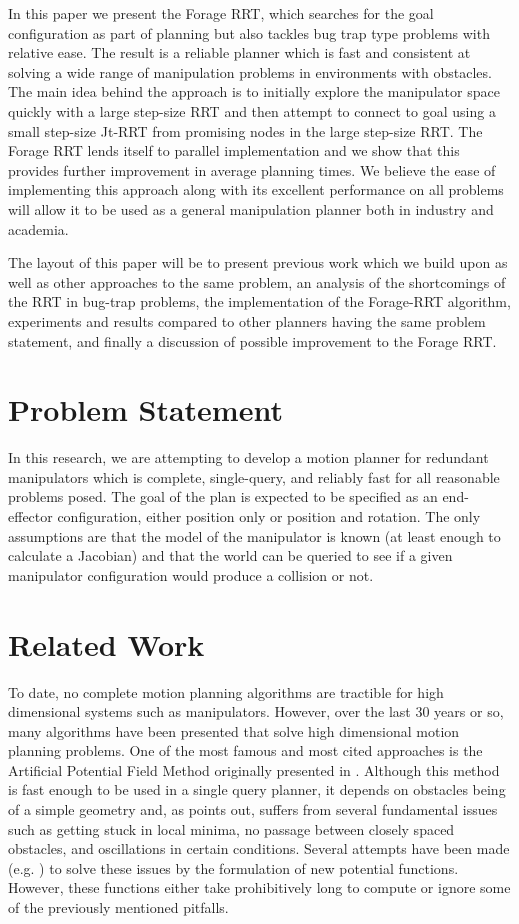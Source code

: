 \documentclass[conference]{IEEEtran}
\begin{document}
In this paper we present the Forage RRT, which searches for the goal configuration as part of planning but also tackles bug trap type
problems with relative ease. The result is a reliable planner which is fast and consistent at solving a wide range of manipulation problems
in environments with obstacles. The main idea behind the approach is to initially explore the manipulator space quickly with a large
step-size RRT and then attempt to connect to goal using a small step-size Jt-RRT from promising nodes in the large step-size RRT. The Forage
RRT lends itself to parallel implementation and we show that this provides further improvement in average planning times. We believe the
ease of implementing this approach along with its excellent performance on all problems will allow it to be used as a general manipulation
planner both in industry and academia.

The layout of this paper will be to present previous work which we build upon as well as other approaches to the same problem, an analysis
of the shortcomings of the RRT in bug-trap problems, the implementation of the Forage-RRT algorithm, experiments and results compared to
other planners having the same problem statement, and finally a discussion of possible improvement to the Forage RRT.  

\section{Problem Statement}
In this research, we are attempting to develop a motion planner for redundant manipulators which is complete, single-query, and reliably
fast for all reasonable problems posed. The goal of the plan is expected to be specified as an end-effector configuration, either position
only or position and rotation. The only assumptions are that the model of the manipulator is known (at least enough to calculate a
Jacobian) and that the world can be queried to see if a given manipulator configuration would produce a collision or not.

\section{Related Work}
To date, no complete motion planning algorithms are tractible for high dimensional systems such as manipulators. However, over the last 30
years or so, many algorithms have been presented that solve high dimensional motion planning problems. One of the most famous and most cited
approaches is the Artificial Potential Field Method originally presented in \cite{khatib86}. Although this method is fast enough to be
used in a single query planner, it depends on obstacles being of a simple geometry and, as \cite{koren91} points out, suffers from several
fundamental issues such as getting stuck in local minima, no passage between closely spaced obstacles, and oscillations in certain
conditions. Several attempts have been made (e.g. \cite{connolly90} \cite{ge00}) to solve these issues by the formulation of new potential
functions. However, these functions either take prohibitively long to compute or ignore some of the previously mentioned pitfalls. 
\end{document}
